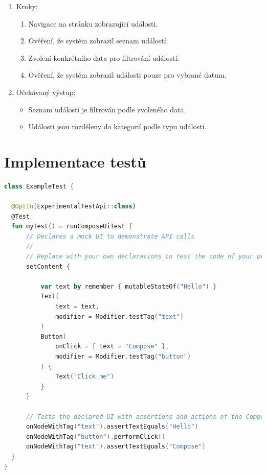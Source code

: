 \begin{enumerate}
  \item Kroky:
    \begin{enumerate}
      \item Navigace na stránku zobrazující události.
      \item Ověření, že systém zobrazil seznam událostí.
      \item Zvolení konkrétního data pro filtrování událostí.
      \item Ověření, že systém zobrazil události pouze pro vybrané datum.
    \end{enumerate}
  \item Očekávaný výstup:
    \begin{itemize}
      \item Seznam událostí je filtrován podle zvoleného data.
      \item Události jsou rozděleny do kategorií podle typu události.
    \end{itemize}
\end{enumerate}

\section{Implementace testů}



\begin{lstlisting}[caption={Implementace UI testu}, label={lst:testImplementation}, language=Kotlin]
  class ExampleTest {

  @OptIn(ExperimentalTestApi::class)
  @Test
  fun myTest() = runComposeUiTest {
      // Declares a mock UI to demonstrate API calls
      //
      // Replace with your own declarations to test the code of your project
      setContent {

          var text by remember { mutableStateOf("Hello") }
          Text(
              text = text,
              modifier = Modifier.testTag("text")
          )
          Button(
              onClick = { text = "Compose" },
              modifier = Modifier.testTag("button")
          ) {
              Text("Click me")
          }
      }

      // Tests the declared UI with assertions and actions of the Compose Multiplatform testing API
      onNodeWithTag("text").assertTextEquals("Hello")
      onNodeWithTag("button").performClick()
      onNodeWithTag("text").assertTextEquals("Compose")
  }
}
\end{lstlisting}

